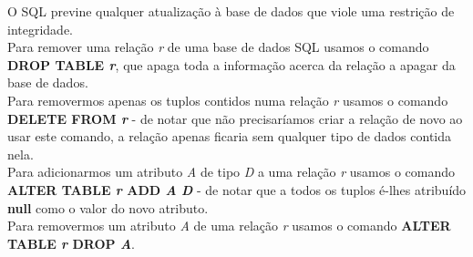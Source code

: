 \documentclass[oneside]{book}
\theoremstyle{definition}
\begin{document}
O SQL previne qualquer atualização à base de dados que viole uma restrição de integridade.\\
Para remover uma relação \textit{r} de uma base de dados SQL usamos o comando \textbf{DROP TABLE \textit{r}}, que apaga toda a informação acerca da relação a apagar da base de dados. \\
Para removermos apenas os tuplos contidos numa relação \textit{r} usamos o comando \textbf{DELETE FROM \textit{r}} - de notar que não precisaríamos criar a relação de novo ao usar este comando, a relação apenas ficaria sem qualquer tipo de dados contida nela. \\
Para adicionarmos um atributo \textit{A} de tipo \textit{D} a uma relação \textit{r} usamos o comando \textbf{ALTER TABLE \textit{r} ADD \textit{A} \textit{D}} - de notar que a todos os tuplos é-lhes atribuído \textbf{null} como o valor do novo atributo. \\
Para removermos um atributo \textit{A} de uma relação \textit{r} usamos o comando \textbf{ALTER TABLE \textit{r} DROP \textit{A}}.\\
\end{document}
